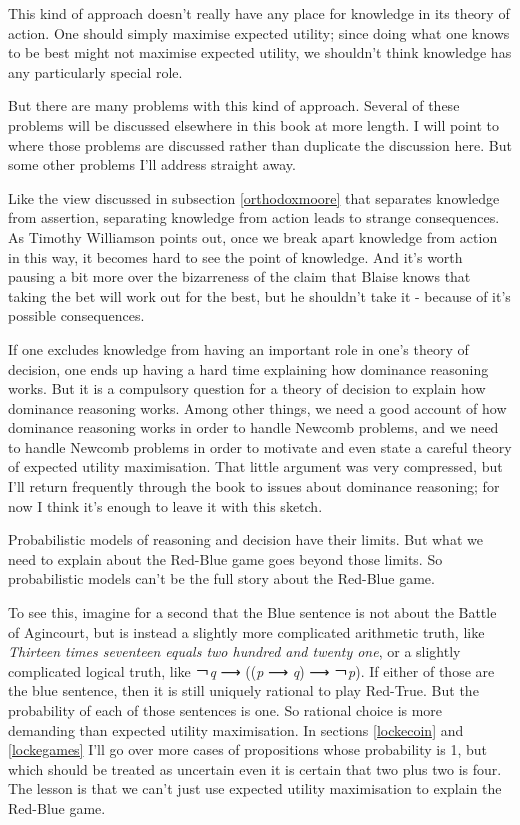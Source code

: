 \documentclass[
  11pt,
]{book}
\begin{document}
This kind of approach doesn't really have any place for knowledge in its theory of action. One should simply maximise expected utility; since doing what one knows to be best might not maximise expected utility, we shouldn't think knowledge has any particularly special role.

But there are many problems with this kind of approach. Several of these problems will be discussed elsewhere in this book at more length. I will point to where those problems are discussed rather than duplicate the discussion here. But some other problems I'll address straight away.

Like the view discussed in subsection \ref{orthodoxmoore} that separates knowledge from assertion, separating knowledge from action leads to strange consequences. As Timothy Williamson \citeyearpar{Williamson2005} points out, once we break apart knowledge from action in this way, it becomes hard to see the point of knowledge. And it's worth pausing a bit more over the bizarreness of the claim that Blaise knows that taking the bet will work out for the best, but he shouldn't take it - because of it's possible consequences.

If one excludes knowledge from having an important role in one's theory of decision, one ends up having a hard time explaining how dominance reasoning works. But it is a compulsory question for a theory of decision to explain how dominance reasoning works. Among other things, we need a good account of how dominance reasoning works in order to handle Newcomb problems, and we need to handle Newcomb problems in order to motivate and even state a careful theory of expected utility maximisation. That little argument was very compressed, but I'll return frequently through the book to issues about dominance reasoning; for now I think it's enough to leave it with this sketch.

Probabilistic models of reasoning and decision have their limits. But what we need to explain about the Red-Blue game goes beyond those limits. So probabilistic models can't be the full story about the Red-Blue game.

To see this, imagine for a second that the Blue sentence is not about the Battle of Agincourt, but is instead a slightly more complicated arithmetic truth, like \emph{Thirteen times seventeen equals two hundred and twenty one}, or a slightly complicated logical truth, like ￢\emph{q} ⟶ ((\emph{p} ⟶ \emph{q}) ⟶ ￢\emph{p}). If either of those are the blue sentence, then it is still uniquely rational to play Red-True. But the probability of each of those sentences is one. So rational choice is more demanding than expected utility maximisation. In sections \ref{lockecoin} and \ref{lockegames} I'll go over more cases of propositions whose probability is 1, but which should be treated as uncertain even it is certain that two plus two is four. The lesson is that we can't just use expected utility maximisation to explain the Red-Blue game.
\end{document}
